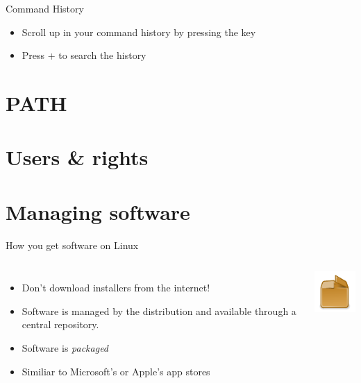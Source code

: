     \begin{frame}[t,fragile]{Command History}
        \begin{itemize}
            \item Scroll up in your command history by pressing the
                \keys{\arrowkeyup} key
            \item Press \keys{\ctrl} +  to search the history
        \end{itemize}
    \end{frame}

    \section{PATH}
    \section{Users \& rights}

    \section{Managing software}

    \begin{frame}[t,fragile]{How you get software on Linux}
        \begin{columns}[T]
            \begin{itemize}
                \item Don't download installers from the internet!
                \item Software is managed by the distribution and available
                    through a central repository.
                \item Software is \emph{packaged}
                \item Similiar to Microsoft's or Apple's app stores
            \end{itemize}
            \vspace{-1cm}
            \begin{center}
                \includegraphics[width=0.7\columnwidth]{img/package-icon.pdf}
            \end{center}
        \end{columns}
    \end{frame}

